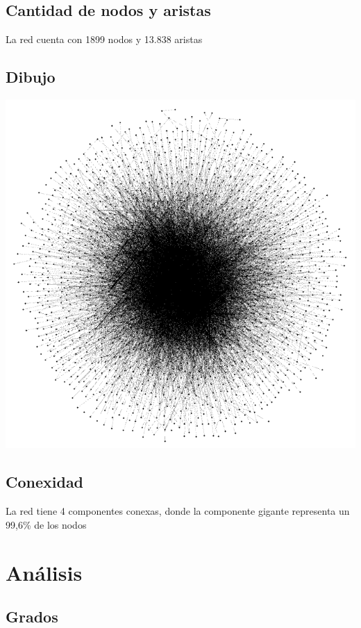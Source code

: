 \documentclass[12pt]{article}
\begin{document}
\subsection{Cantidad de nodos y aristas}
La red cuenta con 1899 nodos y 13.838 aristas

\subsection{Dibujo}
\begin{center}
    \includegraphics[scale=0.4]{images/dibujo_red.png}
\end{center}

\subsection{Conexidad}
La red tiene 4 componentes conexas, donde la componente gigante representa un 99,6\% de los nodos

\section{Análisis}

\subsection{Grados}
\end{document}
